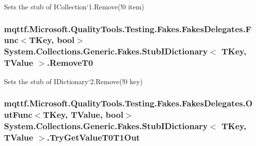 Sets the stub of I\-Collection`1.Remove(!0 item)

\hypertarget{class_system_1_1_collections_1_1_generic_1_1_fakes_1_1_stub_i_dictionary_3_01_t_key_00_01_t_value_01_4_a53ca83be681c7d93d1f29f0c2376e0f7}{
\subsubsection[{Remove\-T0}]{\setlength{\rightskip}{0pt plus 5cm}mqttf.\-Microsoft.\-Quality\-Tools.\-Testing.\-Fakes.\-Fakes\-Delegates.\-Func$<$T\-Key, bool$>$ System.\-Collections.\-Generic.\-Fakes.\-Stub\-I\-Dictionary$<$ T\-Key, T\-Value $>$.Remove\-T0}}\label{class_system_1_1_collections_1_1_generic_1_1_fakes_1_1_stub_i_dictionary_3_01_t_key_00_01_t_value_01_4_a53ca83be681c7d93d1f29f0c2376e0f7}


Sets the stub of I\-Dictionary`2.Remove(!0 key)

\hypertarget{class_system_1_1_collections_1_1_generic_1_1_fakes_1_1_stub_i_dictionary_3_01_t_key_00_01_t_value_01_4_a27d266d4de2ffca8a220cbe290439e23}{
\subsubsection[{Try\-Get\-Value\-T0\-T1\-Out}]{\setlength{\rightskip}{0pt plus 5cm}mqttf.\-Microsoft.\-Quality\-Tools.\-Testing.\-Fakes.\-Fakes\-Delegates.\-Out\-Func$<$T\-Key, T\-Value, bool$>$ System.\-Collections.\-Generic.\-Fakes.\-Stub\-I\-Dictionary$<$ T\-Key, T\-Value $>$.Try\-Get\-Value\-T0\-T1\-Out}}\label{class_system_1_1_collections_1_1_generic_1_1_fakes_1_1_stub_i_dictionary_3_01_t_key_00_01_t_value_01_4_a27d266d4de2ffca8a220cbe290439e23}


